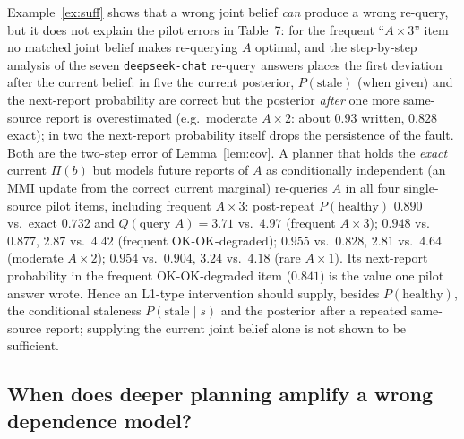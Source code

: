 \begin{remark}\label{rem:pilot}
Example~\ref{ex:suff} shows that a wrong joint belief \emph{can} produce a wrong re-query, but it does not explain the
pilot errors in Table~7: for the frequent ``$A\times3$'' item no matched joint belief makes re-querying $A$ optimal, and
the step-by-step analysis of the seven \texttt{deepseek-chat} re-query answers places the first deviation after the
current belief: in five the current posterior, $P(\text{stale})$ (when given) and the next-report probability are
correct but the posterior \emph{after} one more same-source report is overestimated (e.g.\ moderate $A\times2$:
about $0.93$ written, $0.828$ exact); in two the next-report probability itself drops the persistence of the fault.
Both are the two-step error of Lemma~\ref{lem:cov}. A planner that holds the \emph{exact} current $\Pi(b)$ but models
future reports of $A$ as conditionally independent (an MMI update from the correct current marginal) re-queries $A$
in all four single-source pilot items, including frequent $A\times3$:
post-repeat $P(\text{healthy})$ $0.890$ vs.\ exact $0.732$ and $Q(\text{query }A)=3.71$ vs.\ $4.97$ (frequent $A\times3$);
$0.948$ vs.\ $0.877$, $2.87$ vs.\ $4.42$ (frequent OK-OK-degraded); $0.955$ vs.\ $0.828$, $2.81$ vs.\ $4.64$ (moderate $A\times2$);
$0.954$ vs.\ $0.904$, $3.24$ vs.\ $4.18$ (rare $A\times1$). Its next-report probability in the frequent OK-OK-degraded
item ($0.841$) is the value one pilot answer wrote. Hence an L1-type intervention should supply, besides
$P(\text{healthy})$, the conditional staleness $P(\text{stale}\mid s)$ and the posterior after a repeated same-source
report; supplying the current joint belief alone is not shown to be sufficient.
\end{remark}

\subsection{When does deeper planning amplify a wrong dependence model?}

